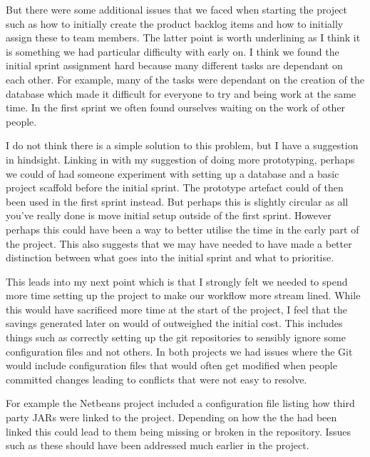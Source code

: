 \documentclass[paper=a4, fontsize=11pt]{scrartcl}	%
\numberwithin{equation}{section}															%
\numberwithin{figure}{section}																%
\numberwithin{table}{section}
\begin{document}
But there were some additional issues that we faced when starting the project such as how to initially create the product backlog items and how to initially assign these to team members. The latter point is worth underlining as I think it is something we had particular difficulty with early on. I think we found the initial sprint assignment hard because many different tasks are dependant on each other. For example, many of the tasks were dependant on the creation of the database which made it difficult for everyone to try and being work at the same time. In the first sprint we often found ourselves waiting on the work of other people.

I do not think there is a simple solution to this problem, but I have a suggestion in hindsight. Linking in with my suggestion of doing more prototyping, perhaps we could of had someone experiment with setting up a database and a basic project scaffold before the initial sprint. The prototype artefact could of then been used in the first sprint instead. But perhaps this is slightly circular as all you've really done is move initial setup outside of the first sprint. However perhaps this could have been a way to better utilise the time in the early part of the project. This also suggests that we may have needed to have made a better distinction between what goes into the initial sprint and what to prioritise.

This leads into my next point which is that I strongly felt we needed to spend more time setting up the project to make our workflow more stream lined. While this would have sacrificed more time at the start of the project, I feel that the savings generated later on would of outweighed the initial cost. This includes things such as correctly setting up the git repositories to sensibly ignore some configuration files and not others. In both projects we had issues where the Git would include configuration files that would often get modified when people committed changes leading to conflicts that were not easy to resolve. 

For example the Netbeans project included a configuration file listing how third party JARs were linked to the project. Depending on how the the had been linked this could lead to them being missing or broken in the repository. Issues such as these should have been addressed much earlier in the project. 
\end{document}
